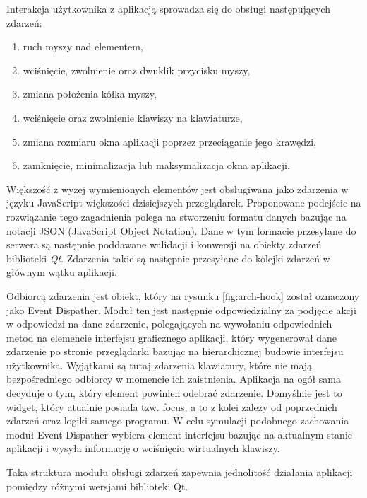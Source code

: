 Interakcja użytkownika z aplikacją sprowadza się do obsługi następujących zdarzeń:
\begin{enumerate}
  \item ruch myszy nad elementem,
  \item wciśnięcie, zwolnienie oraz dwuklik przycisku myszy,
  \item zmiana położenia kółka myszy,
  \item wciśnięcie oraz zwolnienie klawiszy na klawiaturze,
  \item zmiana rozmiaru okna aplikacji poprzez przeciąganie jego krawędzi,
  \item zamknięcie, minimalizacja lub maksymalizacja okna aplikacji.
\end{enumerate}
Większość z wyżej wymienionych elementów jest obsługiwana jako zdarzenia w języku JavaScript większości dzisiejszych przeglądarek. Proponowane podejście na rozwiązanie tego zagadnienia polega na stworzeniu formatu danych bazując na notacji JSON (JavaScript Object Notation). Dane w tym formacie przesyłane do serwera są następnie poddawane walidacji i konwersji na obiekty zdarzeń biblioteki \emph{Qt}. Zdarzenia takie są następnie przesyłane do kolejki zdarzeń w głównym wątku aplikacji.

Odbiorcą zdarzenia jest obiekt, który na rysunku \ref{fig:arch-hook} został oznaczony jako Event Dispather. Moduł ten jest następnie odpowiedzialny za podjęcie akcji w odpowiedzi na dane zdarzenie, polegających na wywołaniu odpowiednich metod na elemencie interfejsu graficznego aplikacji, który wygenerował dane zdarzenie po stronie przeglądarki bazując na hierarchicznej budowie interfejsu użytkownika.
Wyjątkami są tutaj zdarzenia klawiatury, które nie mają bezpośredniego odbiorcy w momencie ich zaistnienia. Aplikacja na ogół sama decyduje o tym, który element powinien odebrać zdarzenie. Domyślnie jest to widget, który atualnie posiada tzw. focus, a to z kolei zależy od poprzednich zdarzeń oraz logiki samego programu. W celu symulacji podobnego zachowania moduł Event Dispather wybiera element interfejsu bazując na aktualnym stanie aplikacji i wysyła informację o wciśnięciu wirtualnych klawiszy. 

Taka struktura modułu obsługi zdarzeń zapewnia jednolitość działania aplikacji pomiędzy różnymi wersjami biblioteki Qt.